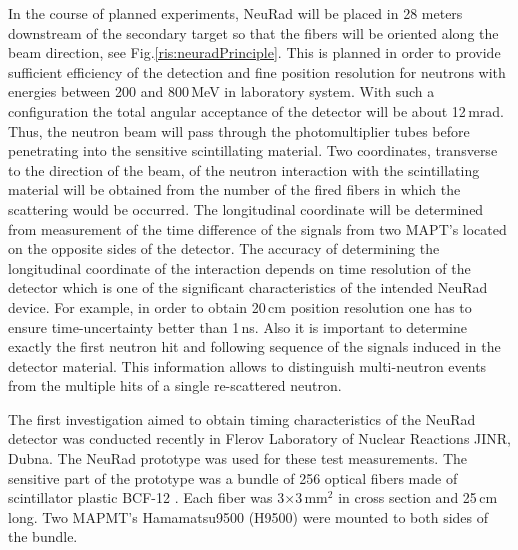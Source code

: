 \documentclass{webofc}
\begin{document}
In the course of planned experiments, NeuRad will be placed in 28 meters downstream of the secondary target so that the fibers will be oriented along the beam direction, see Fig.\ref{ris:neuradPrinciple}.
This is planned in order to provide sufficient efficiency of the detection and fine position resolution for neutrons with energies between 200 and 800\,MeV in laboratory system.
With such a configuration the total angular acceptance of the detector will be about 12\,mrad.
Thus, the neutron beam will pass through the photomultiplier tubes before penetrating into the sensitive scintillating material.
Two coordinates, transverse to the direction of the beam, of the neutron interaction with the scintillating material will be obtained from the number of the fired fibers in which the scattering would be occurred.
The longitudinal coordinate will be determined from measurement of the time difference of the signals from two MAPT's located on the opposite sides of the detector.
The accuracy of determining the longitudinal coordinate of the interaction depends on time resolution of the detector which is one of the significant characteristics of the intended NeuRad device.
For example, in order to obtain 20\,cm position resolution one has to ensure time-uncertainty better than 1\,ns.
Also it is important to determine exactly the first neutron hit and following sequence of the signals induced in the detector material. This information allows to distinguish multi-neutron events from the multiple hits of a single re-scattered neutron.


The first investigation aimed to obtain timing characteristics of the NeuRad detector was conducted recently in Flerov Laboratory of Nuclear Reactions JINR, Dubna. The NeuRad prototype was used for these test measurements. The sensitive part of the prototype was a bundle of 256 optical fibers made of scintillator plastic BCF-12 \cite{crystals}. Each fiber was  3$\times$3\,mm$^2$ in cross section and 25\,cm long.
Two MAPMT's Hamamatsu9500 (H9500) \cite{hm} were mounted to both sides of the bundle.
\end{document}

